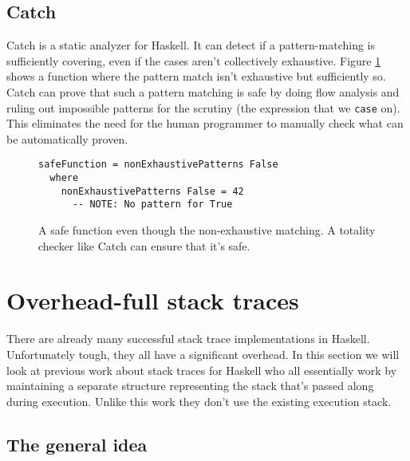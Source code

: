 \subsection{Catch}

Catch is a static analyzer for Haskell. It can detect if a pattern-matching is
sufficiently covering, even if the cases aren't collectively exhaustive. Figure
\ref{fig:catch_example} shows a function where the pattern match isn't exhaustive but
sufficiently so.
Catch can prove that such a pattern
matching is safe by doing flow analysis and ruling out impossible
patterns for the scrutiny (the expression that we \texttt{case} on).
This eliminates the need for the human programmer to manually check what can be
automatically proven. \cite{mitchell:catch_2008_9_25}

\begin{figure}
\begin{mdframed}
      \begin{verbatim}
safeFunction = nonExhaustivePatterns False
  where
    nonExhaustivePatterns False = 42
      -- NOTE: No pattern for True
      \end{verbatim}
      \caption{A safe function even though the non-exhaustive matching. A
        totality checker like Catch can ensure that it's safe.}
      \label{fig:catch_example}
\end{mdframed}
\end{figure}

\section{Overhead-full stack traces} \label{sec:overhead_full}

There are already many successful stack trace implementations in
Haskell. Unfortunately tough, they all have a significant overhead.
In this section we will look at previous work about stack traces for
Haskell who all essentially work by maintaining a separate structure
representing the stack that's passed along during execution. Unlike this
work they don't use the existing execution stack.

\subsection{The general idea}

